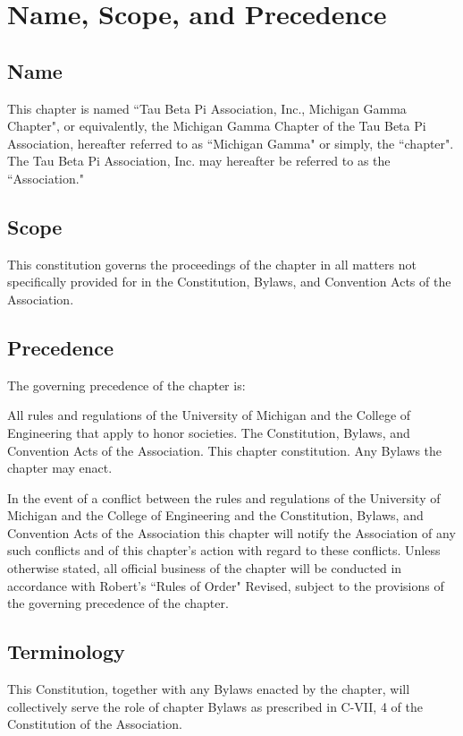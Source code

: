 \chapter{Name, Scope, and Precedence}

\section{Name}
This chapter is named ``Tau Beta Pi Association, Inc., Michigan Gamma Chapter", or equivalently, the Michigan Gamma Chapter of the Tau Beta Pi Association, hereafter referred to as ``Michigan Gamma" or simply, the ``chapter". The Tau Beta Pi Association, Inc. may hereafter be referred to as the ``Association."

\section{Scope}
This constitution governs the proceedings of the chapter in all matters not specifically provided for in the Constitution, Bylaws, and Convention Acts of the Association.
\section{Precedence} The governing precedence of the chapter is:

\begin{compactenum}[1.]
\itemnotoc  All rules and regulations of the University of Michigan and the College of Engineering that apply to honor societies.
\itemnotoc  The Constitution, Bylaws, and Convention Acts of the Association.
\itemnotoc This chapter constitution.
\itemnotoc Any Bylaws the chapter may enact.
\end{compactenum}

In the event of a conflict between  the rules and regulations of the University of Michigan and the College of Engineering and the Constitution, Bylaws, and Convention Acts of the Association this chapter will notify the Association of any such conflicts and of this chapter's action with regard to these conflicts. Unless otherwise stated, all official business of the chapter will  be conducted in accordance with Robert's ``Rules of Order" Revised, subject to the provisions of the governing precedence of the chapter.

\section{Terminology} This Constitution, together with any Bylaws enacted by the chapter, will collectively serve the role of chapter Bylaws as prescribed in C-VII, 4 of the Constitution of the Association.

